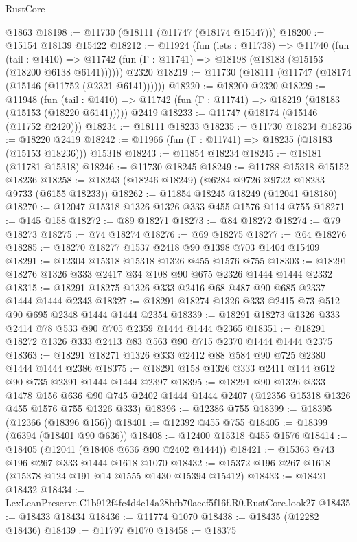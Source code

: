 \begin{lexlean}{RustCore}
\begin{coremodule}
    @1863
@18198 := @11730 (@18111 (@11747 (@18174 @15147)))
@18200 := @15154 @18139 @15422
@18212 := @11924
    (fun (lets : @11738) =>
    @11740
      (fun (tail : @1410) =>
      @11742 (fun (Γ : @11741) => @18198 (@18183 (@15153 (@18200 @6138 @6141))))))
    @2320
@18219 := @11730 (@18111 (@11747 (@18174 (@15146 (@11752 (@2321 @6141))))))
@18220 := @18200 @2320
@18229 := @11948
    (fun (tail : @1410) => @11742 (fun (Γ : @11741) => @18219 (@18183 (@15153 (@18220 @6141)))))
    @2419
@18233 := @11747 (@18174 (@15146 (@11752 @2420)))
@18234 := @18111 @18233
@18235 := @11730 @18234
@18236 := @18220 @2419
@18242 := @11966 (fun (Γ : @11741) => @18235 (@18183 (@15153 @18236))) @15318
@18243 := @11854 @18234
@18245 := @18181 (@11781 @15318)
@18246 := @11730 @18245
@18249 := @11788 @15318 @15152 @18236
@18258 := @18243 (@18246 @18249) (@6284 @9726 @9722 @18233 @9733 (@6155 @18233))
@18262 := @11854 @18245 @18249 (@12041 @18180)
@18270 := @12047 @15318 @1326 @1326 @333 @455 @1576 @114 @755
@18271 := @145 @158
@18272 := @89 @18271
@18273 := @84 @18272
@18274 := @79 @18273
@18275 := @74 @18274
@18276 := @69 @18275
@18277 := @64 @18276
@18285 := @18270 @18277 @1537 @2418 @90 @1398 @703 @1404 @15409
@18291 := @12304 @15318 @15318 @1326 @455 @1576 @755
@18303 := @18291 @18276 @1326 @333 @2417 @34 @108 @90 @675 @2326 @1444 @1444 @2332
@18315 := @18291 @18275 @1326 @333 @2416 @68 @487 @90 @685 @2337 @1444 @1444 @2343
@18327 := @18291 @18274 @1326 @333 @2415 @73 @512 @90 @695 @2348 @1444 @1444 @2354
@18339 := @18291 @18273 @1326 @333 @2414 @78 @533 @90 @705 @2359 @1444 @1444 @2365
@18351 := @18291 @18272 @1326 @333 @2413 @83 @563 @90 @715 @2370 @1444 @1444 @2375
@18363 := @18291 @18271 @1326 @333 @2412 @88 @584 @90 @725 @2380 @1444 @1444 @2386
@18375 := @18291 @158 @1326 @333 @2411 @144 @612 @90 @735 @2391 @1444 @1444 @2397
@18395 := @18291
    @90
    @1326
    @333
    @1478
    @156
    @636
    @90
    @745
    @2402
    @1444
    @1444
    @2407
    (@12356 @15318 @1326 @455 @1576 @755 @1326 @333)
@18396 := @12386 @755
@18399 := @18395 (@12366 (@18396 @156))
@18401 := @12392 @455 @755
@18405 := @18399 (@6394 (@18401 @90 @636))
@18408 := @12400 @15318 @455 @1576
@18414 := @18405 (@12041 (@18408 @636 @90 @2402 @1444))
@18421 := @15363 @743 @196 @267 @333 @1444 @1618 @1070
@18432 := @15372 @196 @267 @1618 (@15378 @124 @191 @14 @1555 @1430 @15394 @15412)
@18433 := @18421 @18432
@18434 := LexLeanPreserve.C1b912f4fc4d4e14a28bfb70aeef5f16f.R0.RustCore.look27
@18435 := @18433 @18434
@18436 := @11774 @1070
@18438 := @18435 (@12282 @18436)
@18439 := @11797 @1070
@18458 := @18375

\end{coremodule}
\end{lexlean}
